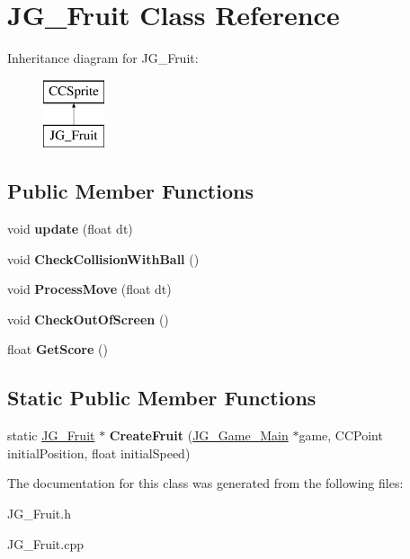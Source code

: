 \hypertarget{class_j_g___fruit}{\section{J\-G\-\_\-\-Fruit Class Reference}
\label{class_j_g___fruit}
}
Inheritance diagram for J\-G\-\_\-\-Fruit\-:\begin{figure}[H]
\begin{center}
\leavevmode
\includegraphics[height=2.000000cm]{class_j_g___fruit}
\end{center}
\end{figure}
\subsection*{Public Member Functions}
\begin{DoxyCompactItemize}
\item 
\hypertarget{class_j_g___fruit_a11c190fb214a37d7edc9b91a6ace714a}{void {\bfseries update} (float dt)}\label{class_j_g___fruit_a11c190fb214a37d7edc9b91a6ace714a}

\item 
\hypertarget{class_j_g___fruit_a5a9bac4669813237ffd8dd6445341371}{void {\bfseries Check\-Collision\-With\-Ball} ()}\label{class_j_g___fruit_a5a9bac4669813237ffd8dd6445341371}

\item 
\hypertarget{class_j_g___fruit_a98194a10c3f8001c3c57a05cd6a7665e}{void {\bfseries Process\-Move} (float dt)}\label{class_j_g___fruit_a98194a10c3f8001c3c57a05cd6a7665e}

\item 
\hypertarget{class_j_g___fruit_a222fabb403c98ddd762bbe8097271d61}{void {\bfseries Check\-Out\-Of\-Screen} ()}\label{class_j_g___fruit_a222fabb403c98ddd762bbe8097271d61}

\item 
\hypertarget{class_j_g___fruit_a373e8466f4394e7291082cc7ef064a8f}{float {\bfseries Get\-Score} ()}\label{class_j_g___fruit_a373e8466f4394e7291082cc7ef064a8f}

\end{DoxyCompactItemize}
\subsection*{Static Public Member Functions}
\begin{DoxyCompactItemize}
\item 
\hypertarget{class_j_g___fruit_a2fb42d26765781c6608a6f30cdc1f19b}{static \hyperlink{class_j_g___fruit}{J\-G\-\_\-\-Fruit} $\ast$ {\bfseries Create\-Fruit} (\hyperlink{class_j_g___game___main}{J\-G\-\_\-\-Game\-\_\-\-Main} $\ast$game, C\-C\-Point initial\-Position, float initial\-Speed)}\label{class_j_g___fruit_a2fb42d26765781c6608a6f30cdc1f19b}

\end{DoxyCompactItemize}


The documentation for this class was generated from the following files\-:\begin{DoxyCompactItemize}
\item 
J\-G\-\_\-\-Fruit.\-h\item 
J\-G\-\_\-\-Fruit.\-cpp\end{DoxyCompactItemize}
